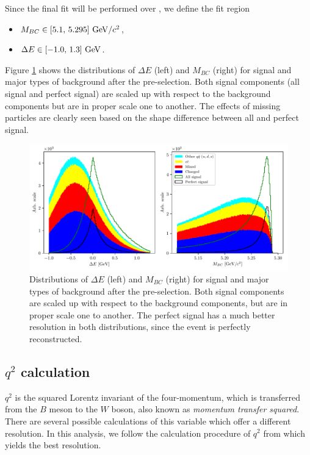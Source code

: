 Since the final fit will be performed over \vars, we define the fit region
\begin{itemize}
	\item $M_{BC} \in [5.1,\,5.295]\mathrm{~GeV}/c^2$,
	\item $\Delta E \in [-1.0,\,1.3]\mathrm{~GeV}$.
\end{itemize}

Figure \ref{fig:mbc_de_pre} shows the distributions of $\Delta E$ (left) and $M_{BC}$ (right) for signal and major types of background after the pre-selection. Both signal components (all signal and perfect signal) are scaled up with respect to the background components but are in proper scale one to another. The effects of missing particles are clearly seen based on the shape difference between all and perfect signal.

\begin{figure}[H]
	\centering
	\captionsetup{width=0.8\linewidth}
	\includegraphics[width=\linewidth]{fig/mbc_de_pre}
	\caption{Distributions of $\Delta E$ (left) and $M_{BC}$ (right) for signal and major types of background after the pre-selection. Both signal components are scaled up with respect to the background components, but are in proper scale one to another. The perfect signal has a much better resolution in both distributions, since the event is perfectly reconstructed.}
	\label{fig:mbc_de_pre}
\end{figure}

\subsection{\texorpdfstring{$q^2$}{q2} calculation}
$q^2$ is the squared Lorentz invariant of the four-momentum, which is transferred from the $B$ meson to the $W$ boson, also known as \textit{momentum transfer squared}. There are several possible calculations of this variable which offer a different resolution. In this analysis, we follow the calculation procedure of $q^2$ from \cite{VubCLEO} which yields the best resolution.

